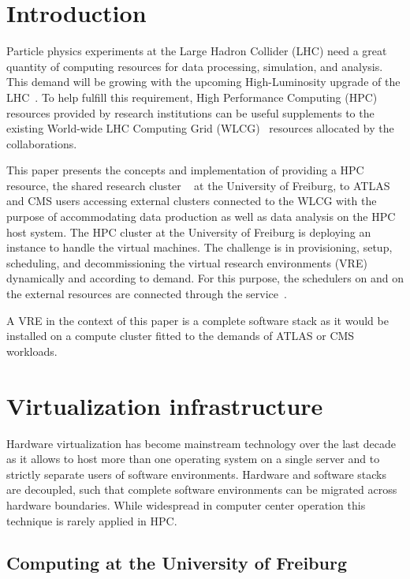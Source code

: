 \section{Introduction}
\label{intro}
Particle physics experiments at the Large Hadron Collider (LHC) need a
great quantity of computing resources for data processing, simulation, and analysis.
This demand will be growing with the upcoming High-Luminosity upgrade of the LHC~\cite{HLLHCcompneeds}.
To help fulfill this requirement, High Performance Computing (HPC) resources provided by research institutions
can be useful supplements to the existing World-wide LHC Computing
Grid (WLCG)~\cite{wlcg} resources
allocated by the collaborations.


This paper presents the concepts and implementation of providing a HPC resource, the
shared research cluster \NEMO~\cite{nemo} at the University of Freiburg, to ATLAS and CMS users accessing external clusters connected to the WLCG with the purpose of accommodating data production as well as
data analysis on the HPC host system. The HPC cluster \NEMO at
the University of Freiburg is deploying an \Openstack~\cite{Openstack} instance to handle the
virtual machines. The challenge is in provisioning, setup, scheduling, and decommissioning the virtual research environments (VRE) dynamically and according to demand. For this purpose, the schedulers on \NEMO and on the external resources are
connected through the \Roced service~\cite{ROCED}.


A VRE in the context of this paper is a complete software stack
as it would be installed on a compute cluster fitted to the demands of ATLAS or CMS workloads.


\section{Virtualization infrastructure}
\label{sec:openstack}

Hardware virtualization has become mainstream technology over the last decade as it allows
to host more than one operating system on a single server and to strictly
separate users of software environments.
Hardware and software stacks are decoupled, such that complete software
environments can be migrated across hardware boundaries.
While widespread in computer center
operation this technique is rarely applied in HPC.


\subsection{Computing at the University of Freiburg}


